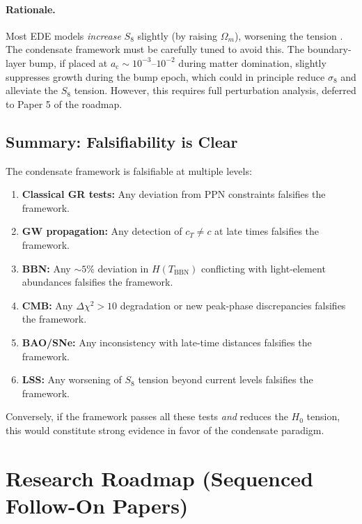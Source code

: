 \documentclass[11pt,a4paper]{article}
\newcommand{\ac}{a_{\mathrm{c}}}
\theoremstyle{definition}
\begin{document}
\paragraph{Rationale.}
Most EDE models \emph{increase} $S_8$ slightly (by raising $\Omega_m$), worsening the tension \cite{HillEDE2020}. The condensate framework must be carefully tuned to avoid this. The boundary-layer bump, if placed at $\ac \sim 10^{-3}$--$10^{-2}$ during matter domination, slightly suppresses growth during the bump epoch, which could in principle reduce $\sigma_8$ and alleviate the $S_8$ tension. However, this requires full perturbation analysis, deferred to Paper 5 of the roadmap.

\subsection{Summary: Falsifiability is Clear}
\label{sec:falsifiability_summary}

The condensate framework is falsifiable at multiple levels:
\begin{enumerate}[leftmargin=2.2em]
  \item \textbf{Classical GR tests:} Any deviation from PPN constraints falsifies the framework.
  \item \textbf{GW propagation:} Any detection of $c_T \neq c$ at late times falsifies the framework.
  \item \textbf{BBN:} Any $\sim 5\%$ deviation in $H(T_{\mathrm{BBN}})$ conflicting with light-element abundances falsifies the framework.
  \item \textbf{CMB:} Any $\Delta\chi^2 > 10$ degradation or new peak-phase discrepancies falsifies the framework.
  \item \textbf{BAO/SNe:} Any inconsistency with late-time distances falsifies the framework.
  \item \textbf{LSS:} Any worsening of $S_8$ tension beyond current levels falsifies the framework.
\end{enumerate}

Conversely, if the framework passes all these tests \emph{and} reduces the $H_0$ tension, this would constitute strong evidence in favor of the condensate paradigm.

\section{Research Roadmap (Sequenced Follow-On Papers)}
\label{sec:roadmap}
\end{document}
